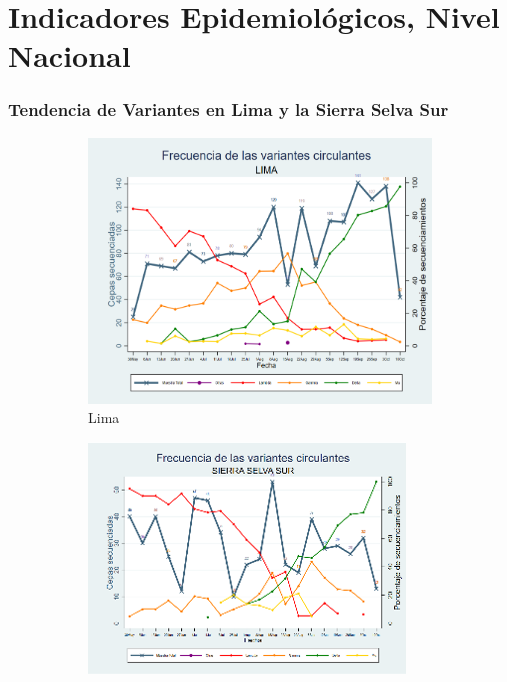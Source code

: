 \documentclass[xcolor=table]{beamer}
\begin{document}
	\section{Indicadores Epidemiológicos, Nivel Nacional}

	\begin{frame}[label=epi_nacional]
	\frametitle{Tendencia de Variantes en Lima y la Sierra Selva Sur}
	\vspace{-.5cm}
	\begin{figure}
		\centering
		\begin{subfigure}[b]{0.45\textwidth}
			\centering
			\includegraphics[width=\textwidth]{../sala_nacional/variantes_lima.png}
			\caption{Lima}
		\end{subfigure}
		\hfill
		\begin{subfigure}[b]{0.48\textwidth}
			\centering
			\includegraphics[width=\textwidth]{../sala_nacional/variantes_sierra_sur.png}

\end{subfigure}
\end{figure}
\end{frame}
\end{document}
